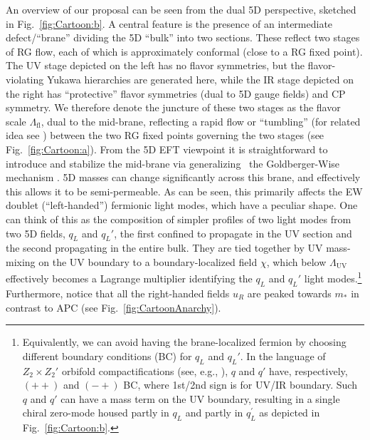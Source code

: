 \documentclass[aps,prl,twocolumn,showpacs,10pt,preprintnumbers,nofootinbib]{revtex4-2}
\newcommand{\mst}{m_*}
\newcommand{\Lfl}{\Lambda_{\text{fl}}}
\begin{document}
An overview of our proposal can be seen from the dual 5D perspective, sketched in Fig.~\ref{fig:Cartoon:b}.
A central feature is the presence of an intermediate  defect/``brane'' dividing the 5D ``bulk'' into two sections. These reflect two stages of RG flow, each of which is approximately conformal (close to a RG fixed point). The UV stage depicted on the left has no flavor symmetries, but the flavor-violating Yukawa hierarchies are generated here, while the IR stage depicted on the right has ``protective'' flavor symmetries (dual to 5D gauge fields) and CP symmetry. We therefore denote the juncture of these two stages as the flavor scale $\Lfl$, dual to the mid-brane,  reflecting a rapid flow or ``tumbling'' (for related idea see \cite{RABY1980373,Klebanov:2000hb}) between the two RG fixed points governing the two stages (see Fig.~\ref{fig:Cartoon:a}). From the 5D EFT viewpoint it is straightforward to introduce and stabilize the mid-brane via generalizing~\cite{Lee:2021wau,Agashe:2016rle} the Goldberger-Wise mechanism \cite{Goldberger:1999uk}. 5D masses can change significantly across this brane, and effectively this allows it to be semi-permeable. As can be seen, this primarily affects the EW doublet (``left-handed'') fermionic light modes, which have a peculiar shape. One can think of this as the composition of simpler profiles of two light modes from two 5D fields, $q_L$ and $q_L'$, the first confined to propagate in the UV section and the second propagating in the entire bulk. They are tied together by UV mass-mixing on the UV boundary to a boundary-localized field $\chi$, which below $\Lambda_{\text{UV}}$ effectively becomes a Lagrange multiplier identifying the $q_L$ and $ q_L'$ light modes.\footnote{Equivalently, we can avoid having the brane-localized fermion by choosing different boundary conditions (BC) for $q_L$ and $q_L'$. In the language of $Z_2\times Z_2'$ orbifold compactifications (see, e.g., \cite{Barbieri:2000vh}), $q$ and $q'$ have, respectively, $(++)$ and $(-+)$ BC, where 1st/2nd sign is for UV/IR boundary. Such $q$ and $q'$ can have a mass term on the UV boundary, resulting in a single chiral zero-mode housed partly in $q_L$ and partly in $q^{\prime}_L$ as depicted in Fig.~\ref{fig:Cartoon:b}.} Furthermore, notice that all the right-handed fields $u_R$ are peaked towards $\mst$ in contrast to APC (see Fig.~\ref{fig:CartoonAnarchy}).
\end{document}
